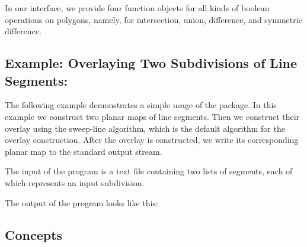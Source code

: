 \begin{ccTexOnly}
In our interface, we provide four function objects 
for all kinds of boolean operations on polygons,
namely, for intersection, union, difference, and 
symmetric difference.


\subsection*{Example: Overlaying Two Subdivisions of Line Segments:}
The following example demonstrates a simple usage of the 
 package.
In this example we construct two planar maps of line segments. 
Then we construct their overlay using the sweep-line algorithm, which is 
the default algorithm for the overlay construction. 
After the overlay is constructed, we write its corresponding planar map to the 
standard output stream. 

The input of the program is a text file containing two lists of segments, 
each of which represents an input subdivision.

The output of the program looks like this:


\subsection*{Concepts}
\\
\\
\\
\\
\\
\\
\\


\end{ccTexOnly}

